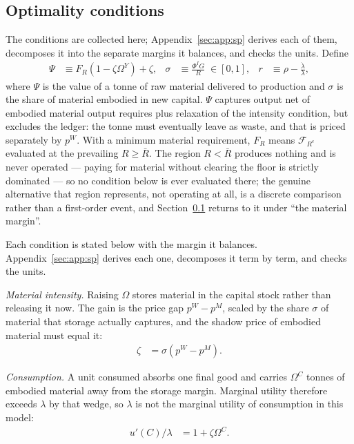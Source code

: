 \subsection{Optimality conditions}\label{sec:sp:opt:foc}

The conditions are collected here; Appendix~\ref{sec:app:sp} derives each of them, decomposes it into the separate margins it balances, and checks the units. Define
\begin{align}
\Psi &\equiv F_R\left(1-\zeta\Omega^Y\right)+\zeta,
&
\sigma &\equiv \frac{\Phi^IG}{R}\;\in\left[0,1\right],
&
r &\equiv \rho-\frac{\dot\lambda}{\lambda},
\label{eq:sp:shorthand}
\end{align}
where $\Psi$ is the value of a tonne of raw material delivered to production and $\sigma$ is the share of material embodied in new capital. $\Psi$ captures output net of embodied material output requires plus relaxation of the intensity condition, but excludes the ledger: the tonne must eventually leave as waste, and that is priced separately by $p^W$. With a minimum material requirement, $F_R$ means $\mathcal F_{R^e}$ evaluated at the prevailing $R\ge\bar R$. The region $R<\bar R$ produces nothing and is never operated --- paying for material without clearing the floor is strictly dominated --- so no condition below is ever evaluated there; the genuine alternative that region represents, not operating at all, is a discrete comparison rather than a first-order event, and Section~\ref{sec:sp:opt:foc} returns to it under ``the material margin''.

 Each condition is stated below with the margin it balances. Appendix~\ref{sec:app:sp} derives each one, decomposes it term by term, and checks the units.

\emph{Material intensity.} Raising $\Omega$ stores material in the capital stock rather than releasing it now. The gain is the price gap $p^W-p^M$, scaled by the share $\sigma$ of material that storage actually captures, and the shadow price of embodied material must equal it:
\begin{align}
\zeta &= \sigma\left(p^W-p^M\right).
\label{eq:sp:sum:Omega}
\end{align}

\emph{Consumption.} A unit consumed absorbs one final good and carries $\Omega^C$ tonnes of embodied material away from the storage margin. Marginal utility therefore exceeds $\lambda$ by that wedge, so $\lambda$ is not the marginal utility of consumption in this model:
\begin{align}
u'\left(C\right)/\lambda &= 1+\zeta\Omega^C .
\label{eq:sp:sum:C}
\end{align}


